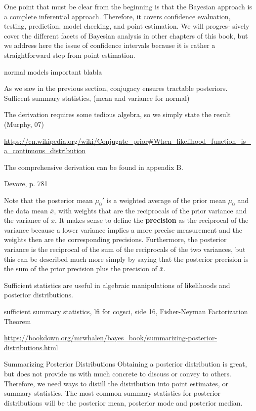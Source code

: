 One point that must be clear from the beginning is that the Bayesian approach is a complete inferential approach. Therefore, it covers confidence evaluation, testing, prediction, model checking, and point estimation. We will progres- sively cover the different facets of Bayesian analysis in other chapters of this book, but we address here the issue of confidence intervals because it is rather a straightforward step from point estimation.

normal models important blabla

As we saw in the previous section, conjugacy ensures tractable posteriors. Sufficent summary statistics, (mean and variance for normal)

The derivation requires some tedious algebra, so we simply state the result (Murphy, 07)

\url{https://en.wikipedia.org/wiki/Conjugate_prior#When_likelihood_function_is_a_continuous_distribution}


The comprehensive derivation can be found in appendix B. 

Devore, p. 781 

Note that the posterior mean $\mu_0'$ is a weighted average of the prior mean $\mu_0$ and the data mean $\bar{x}$, with weights that are the reciprocals of the prior variance and the variance of $\bar{x}$. It makes sense to define the \textbf{precision} as the reciprocal of the variance because a lower variance implies a more precise measurement and the weights then are the corresponding precisions. Furthermore, the posterior variance is the reciprocal of the sum of the reciprocals of the two variances, but this can be described much more simply by saying that the posterior precision is the sum of the prior precision plus the precision of $\bar{x}$.  


Sufficient statistics are useful in algebraic manipulations of likelihoods and posterior distributions.

sufficient summary statistics, lfi for cogsci, side 16, Fisher-Neyman Factorization Theorem

\url{https://bookdown.org/mrwhalen/bayes_book/summarizing-posterior-distributions.html}

Summarizing Posterior Distributions
Obtaining a posterior distribution is great, but does not provide us with much concrete to discuss or convey to others. Therefore, we need ways to distill the distribution into point estimates, or summary statistics. The most common summary statistics for posterior distributions will be the posterior mean, posterior mode and posterior median.

